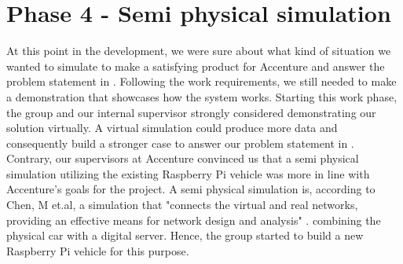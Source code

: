 \section{Phase 4 - Semi physical simulation}
At this point in the development, we were sure about what kind of situation we wanted to simulate to make a satisfying product for Accenture and answer the problem statement in . Following the work requirements, we still needed to make a demonstration that showcases how the system works. Starting this work phase, the group and our internal supervisor strongly considered demonstrating our solution virtually. A virtual simulation could produce more data and consequently build a stronger case to answer our problem statement in . Contrary, our supervisors at Accenture convinced us that a semi physical simulation utilizing the existing Raspberry Pi vehicle was more in line with Accenture's goals for the project. A semi physical simulation is, according to Chen, M et.al, a simulation that "connects the virtual and real networks, providing an effective means for network design and analysis" \parencite{Chen2019}. combining the physical car with a digital server. Hence, the group started to build a new Raspberry Pi vehicle for this purpose.




\clearpage
%
%

